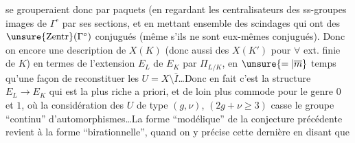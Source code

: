 se grouperaient donc  par paquets (en regardant les centralisateurs des ss-groupes images de $\Gamma^\circ$ par ses sections,\deleted{)} et en mettant ensemble des scindages qui ont des $\unsure{\mathrm{Zentr}}(\Gamma^\circ)$ conjugués (même s'ils ne sont eux-mêmes conjugués). Donc on  encore une description de $X(K)$ (donc aussi des $X(K')$ pour $\forall$ ext. finie  de $K$) en termes de l'extension $E_L$ de $E_K$ par $\Pi_{L/K}$, en $\unsure{=|\overline m}$ temps qu'une façon de reconstituer les $U=X\setminus\bar I$\ldots Donc en fait c'est la structure $E_L\longrightarrow E_K$ qui est la plus riche a priori, et de loin plus commode pour le genre $0$ et $1$, où la considération des $U$ de type $(g,\nu)$, $(2g+\nu\geq3)$ casse le groupe ``continu'' d'automorphismes\ldots La forme ``modélique'' de la conjecture précédente revient à la forme ``birationnelle'', quand on y précise cette dernière en disant que 
